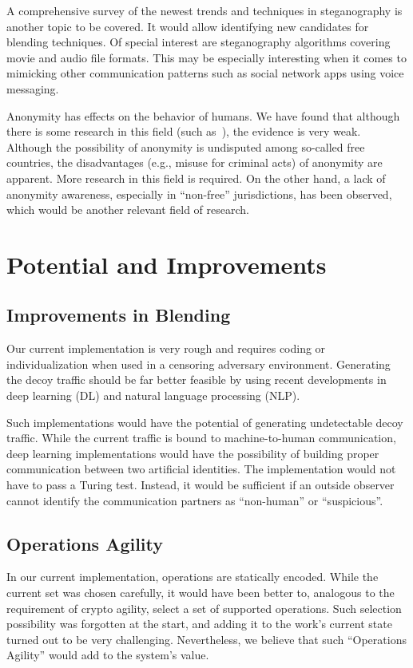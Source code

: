 A comprehensive survey of the newest trends and techniques in steganography is another topic to be covered. It would allow identifying new candidates for blending techniques. Of special interest are steganography algorithms covering movie and audio file formats. This may be especially interesting when it comes to mimicking other communication patterns such as social network apps using voice messaging.

Anonymity has effects on the behavior of humans. We have found that although there is some research in this field (such as~\cite{postmes2001social}), the evidence is very weak. Although the possibility of anonymity is undisputed among so-called free countries, the disadvantages (e.g., misuse for criminal acts) of anonymity are apparent. More research in this field is required. On the other hand, a lack of anonymity awareness, especially in ``non-free'' jurisdictions, has been observed, which would be another relevant field of research. 

\chapter{Potential and Improvements}
\section{Improvements in Blending}
Our current implementation is very rough and requires coding or individualization when used in a censoring adversary environment. Generating the decoy traffic should be far better feasible by using recent developments in deep learning (DL) and natural language processing (NLP). 

Such implementations would have the potential of generating undetectable decoy traffic. While the current traffic is bound to machine-to-human communication, deep learning implementations would have the possibility of building proper communication between two artificial identities. The implementation would not have to pass a Turing test. Instead, it would be sufficient if an outside observer cannot identify the communication partners as ``non-human'' or ``suspicious''.

\section{Operations Agility}
In our current implementation, operations are statically encoded. While the current set was chosen carefully, it would have been better to, analogous to the requirement of crypto agility, select a set of supported operations. Such selection possibility was forgotten at the start, and adding it to the work's current state turned out to be very challenging. Nevertheless, we believe that such ``Operations Agility'' would add to the system's value.

